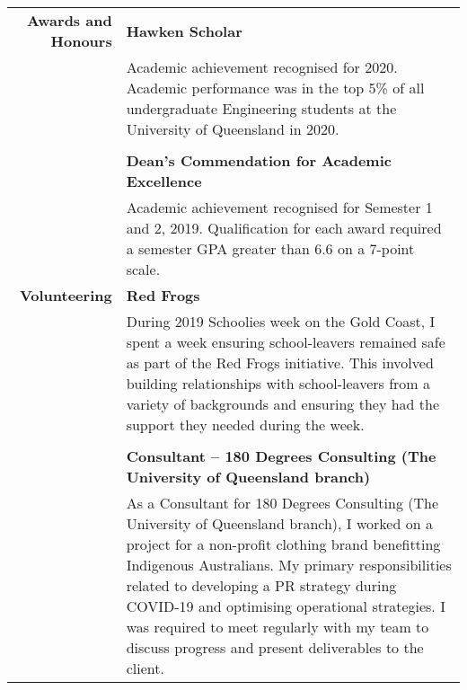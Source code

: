 \documentclass[a4paper]{article}
\begin{document}
\begin{longtable}{r p{13.5cm}}
	\textbf{Awards and Honours}  \vline & \textbf{Hawken Scholar} \\
										\vline & Academic achievement recognised for 2020. Academic performance was in the top 5\% of all undergraduate Engineering students at the University of Queensland in 2020. \\
										\vline & \\
										
										\vline & \textbf{Dean's Commendation for Academic Excellence} \\
										\vline & Academic achievement recognised for Semester 1 and 2, 2019. Qualification for each award required a semester GPA greater than 6.6 on a 7-point scale. \\
										
	\textbf{Volunteering} 	\vline & \textbf{Red Frogs} \\
										\vline & During 2019 Schoolies week on the Gold Coast, I spent a week ensuring school-leavers remained safe as part of the Red Frogs initiative. This involved building relationships with school-leavers from a variety of backgrounds and ensuring they had the support they needed during the week. \\
										\vline & \\
										
										\vline & \textbf{Consultant – 180 Degrees Consulting (The University of Queensland branch)} \\
										\vline & As a Consultant for 180 Degrees Consulting (The University of Queensland branch), I worked on a project for a non-profit clothing brand benefitting Indigenous Australians. My primary responsibilities related to developing a PR strategy during COVID-19 and optimising operational strategies. I was required to meet regularly with my team to discuss progress and present deliverables to the client. \\
							     
\end{longtable}
\end{document}
